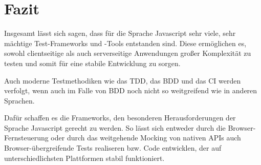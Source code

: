 \section{Fazit}

Insgesamt lässt sich sagen, dass für die Sprache Javascript sehr viele, sehr mächtige Test-Frameworks und -Tools entstanden sind.
Diese ermöglichen es, sowohl clientseitige als auch serverseitige Anwendungen großer Komplexität zu testen und somit für eine stabile Entwicklung zu sorgen.

Auch moderne Testmethodiken wie das \ac{TDD}, das \ac{BDD} und das \ac{CI} werden verfolgt, wenn auch im Falle von \ac{BDD} noch nicht so weitgreifend wie in anderen Sprachen.

Dafür schaffen es die Frameworks, den besonderen Herausforderungen der Sprache Javascript gerecht zu werden. So lässt sich entweder durch die Browser-Fernsteuerung oder durch das weitgehende Mocking von nativen APIs auch Browser-übergreifende Tests realiseren bzw. Code entwicklen, der auf unterschiedlichsten Plattformen stabil funktioniert.

